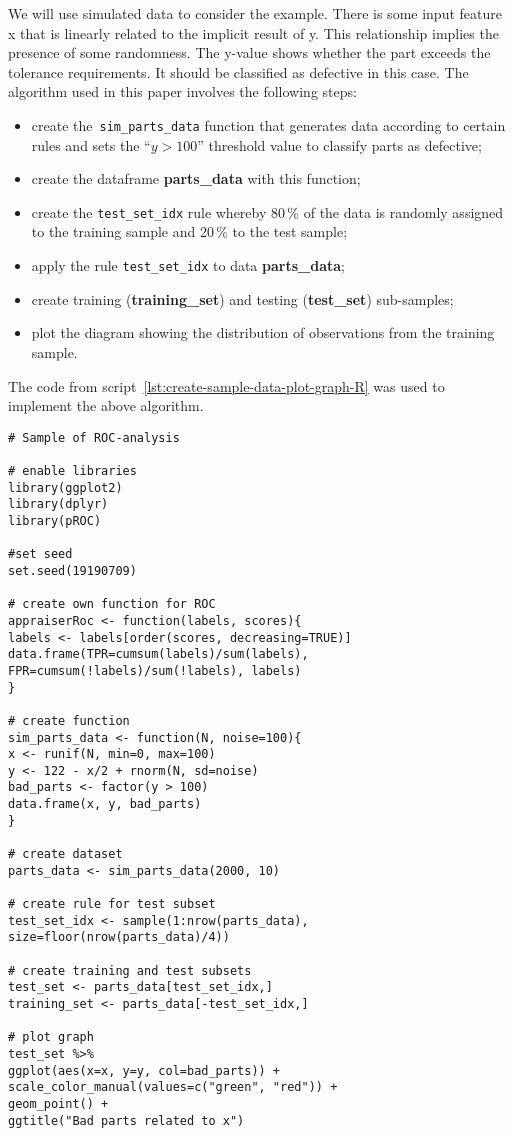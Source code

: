 \documentclass[]{scrreprt}
\begin{document}
We will use simulated data to consider the example. There is some input feature x that is linearly related to the implicit result of y. This relationship implies the presence of some randomness. The y-value shows whether the part exceeds the tolerance requirements. It should be classified as defective in this case. The algorithm used in this paper involves the following steps:
\begin{itemize}
	\item create the~\texttt{sim\_parts\_data} function that generates data according to certain rules and sets the ``$y>100$'' threshold value to classify parts as defective;
	\item create the dataframe \textbf{parts\_data} with this function;
	\item create the \texttt{test\_set\_idx} rule whereby 80\,\% of the data is randomly assigned to the training sample and 20\,\% to the test sample;
	\item apply the rule \texttt{test\_set\_idx} to data \textbf{parts\_data};
	\item create training (\textbf{training\_set}) and testing (\textbf{test\_set}) sub-samples;
	\item plot the diagram showing the distribution of observations from the training sample.
\end{itemize}
The code from script~\ref{lst:create-sample-data-plot-graph-R} was used to implement the above algorithm.
%
\begin{lstlisting}[float=htp, caption = Creation and primary visualization of~data on~quality and defective parts, firstnumber=1, label= lst:create-sample-data-plot-graph-R]
# Sample of ROC-analysis

# enable libraries
library(ggplot2)
library(dplyr)
library(pROC)

#set seed
set.seed(19190709)

# create own function for ROC
appraiserRoc <- function(labels, scores){
labels <- labels[order(scores, decreasing=TRUE)]
data.frame(TPR=cumsum(labels)/sum(labels),
FPR=cumsum(!labels)/sum(!labels), labels)
}

# create function 
sim_parts_data <- function(N, noise=100){
x <- runif(N, min=0, max=100)
y <- 122 - x/2 + rnorm(N, sd=noise)
bad_parts <- factor(y > 100)
data.frame(x, y, bad_parts)
}

# create dataset
parts_data <- sim_parts_data(2000, 10)

# create rule for test subset
test_set_idx <- sample(1:nrow(parts_data), size=floor(nrow(parts_data)/4))

# create training and test subsets
test_set <- parts_data[test_set_idx,]
training_set <- parts_data[-test_set_idx,]

# plot graph
test_set %>% 
ggplot(aes(x=x, y=y, col=bad_parts)) + 
scale_color_manual(values=c("green", "red")) + 
geom_point() + 
ggtitle("Bad parts related to x")

\end{lstlisting}
%
\end{document}
